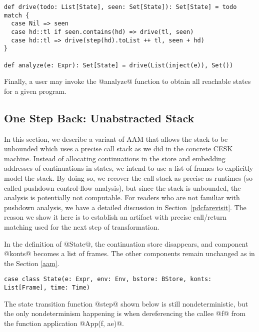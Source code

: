 \documentclass[acmsmall]{acmart}\settopmatter{}
\begin{document}
\begin{lstlisting}
def drive(todo: List[State], seen: Set[State]): Set[State] = todo match {
  case Nil => seen
  case hd::tl if seen.contains(hd) => drive(tl, seen)
  case hd::tl => drive(step(hd).toList ++ tl, seen + hd)
}

def analyze(e: Expr): Set[State] = drive(List(inject(e)), Set())
\end{lstlisting}

Finally, a user may invoke the @analyze@ function to obtain all reachable states for 
a given program.


\subsection{One Step Back: Unabstracted Stack} \label{unabs}

In this section, we describe a variant of AAM that allows the stack to be
unbounded which uses a precise call stack as we did in the concrete CESK machine.
Instead of allocating continuations in the store and embedding
addresses of continuations in states, we intend to use a list of frames
to explicitly model the stack.
By doing so, we recover the call stack as precise as runtimes
(so called pushdown control-flow analysis), but since
the stack is unbounded, the analysis is potentially not computable.
For readers who are not familiar with pushdown analysis, we have a detailed
discussion in Section~\ref{pdcfarevisit}.
The reason we show it here is to establish an artifact with precise call/return 
matching used for the next step of transformation.

In the definition of @State@, the continuation store disappears, and
component @konts@ becomes a list of frames. 
The other components remain unchanged as in the Section \ref{aam}.

\begin{lstlisting}
case class State(e: Expr, env: Env, bstore: BStore, konts: List[Frame], time: Time)
\end{lstlisting}

The state transition function @step@ shown below is still
nondeterministic, but the only nondeterminism happening is when dereferencing the callee @f@
from the function application @App(f, ae)@.
\end{document}
